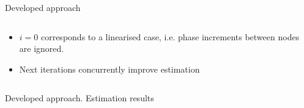 \documentclass[../main.tex]{subfiles}
\begin{document}
\begin{frame}[t]{Developed approach}
{\begin{columns}
	\begin{column}{0.5\textwidth}
	\begin{itemize}
		\item $i = 0$ corresponds to a linearised case, i.e. phase increments between nodes are ignored.
		\item Next iterations concurrently improve estimation
	\end{itemize}
	\end{column}
	\end{columns}
	
}
\end{frame}


%
%


\begin{frame}[t]{Developed approach. Estimation results}

\begin{columns}[t]
\begin{column}{0.4\textwidth}
\centering
\begin{itemize}
\end{itemize}


\end{column}
\end{columns}
\end{frame}
\end{document}
